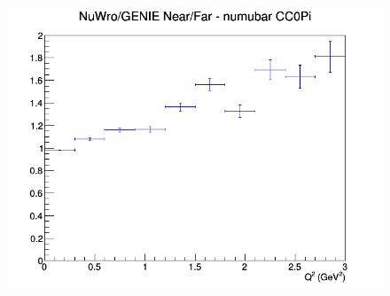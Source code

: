 \begin{figure}[h]
\endminipage
{}
\includegraphics[width=\linewidth]{eff_Q2/LAr/ratios/CC0Pi_NuWro_GENIE_numubar_NF_Q2.png}
\endminipage
\newline
\end{figure}
\clearpage
